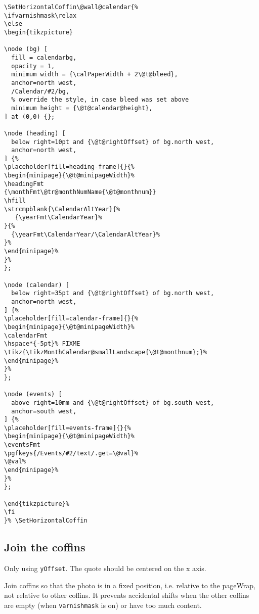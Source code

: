 \documentclass[11pt,oneside]{memoir-article}
\begin{document}
\begin{verbatim}
\SetHorizontalCoffin\@wall@calendar{%
\ifvarnishmask\relax
\else
\begin{tikzpicture}

\node (bg) [
  fill = calendarbg,
  opacity = 1,
  minimum width = {\calPaperWidth + 2\@t@bleed},
  anchor=north west,
  /Calendar/#2/bg,
  % override the style, in case bleed was set above
  minimum height = {\@t@calendar@height},
] at (0,0) {};

\node (heading) [
  below right=10pt and {\@t@rightOffset} of bg.north west,
  anchor=north west,
] {%
\placeholder[fill=heading-frame]{}{%
\begin{minipage}{\@t@minipageWidth}%
\headingFmt
{\monthFmt\@tr@monthNumName{\@t@monthnum}}
\hfill
\strcmpblank{\CalendarAltYear}{%
   {\yearFmt\CalendarYear}%
}{%
  {\yearFmt\CalendarYear/\CalendarAltYear}%
}%
\end{minipage}%
}%
};

\node (calendar) [
  below right=35pt and {\@t@rightOffset} of bg.north west,
  anchor=north west,
] {%
\placeholder[fill=calendar-frame]{}{%
\begin{minipage}{\@t@minipageWidth}%
\calendarFmt
\hspace*{-5pt}% FIXME
\tikz{\tikzMonthCalendar@smallLandscape{\@t@monthnum};}%
\end{minipage}%
}%
};

\node (events) [
  above right=10mm and {\@t@rightOffset} of bg.south west,
  anchor=south west,
] {%
\placeholder[fill=events-frame]{}{%
\begin{minipage}{\@t@minipageWidth}%
\eventsFmt
\pgfkeys{/Events/#2/text/.get=\@val}%
\@val%
\end{minipage}%
}%
};

\end{tikzpicture}%
\fi
}% \SetHorizontalCoffin
\end{verbatim}

\subsection{Join the coffins}
\label{sec-10-5-5}

Only using \texttt{yOffset}. The quote should be centered on the x axis.

Join coffins so that the photo is in a fixed position, i.e. relative to the
pageWrap, not relative to other coffins. It prevents accidental shifts when the
other coffins are empty (when \texttt{varnishmask} is on) or have too much content.
\end{document}
